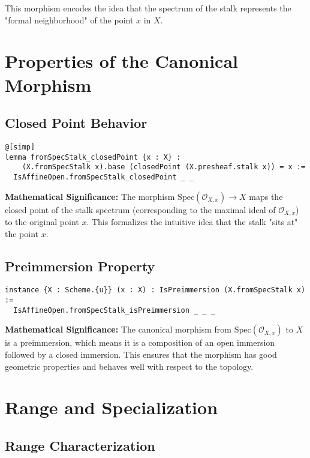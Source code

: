 \documentclass{article}
\theoremstyle{definition}
\begin{document}
This morphism encodes the idea that the spectrum of the stalk represents the "formal neighborhood" of the point $x$ in $X$.

\section{Properties of the Canonical Morphism}

\subsection{Closed Point Behavior}

\begin{lstlisting}
@[simp]
lemma fromSpecStalk_closedPoint {x : X} :
    (X.fromSpecStalk x).base (closedPoint (X.presheaf.stalk x)) = x :=
  IsAffineOpen.fromSpecStalk_closedPoint _ _
\end{lstlisting}

\textbf{Mathematical Significance:} The morphism $\mathrm{Spec}(\mathcal{O}_{X,x}) \to X$ maps the closed point of the stalk spectrum (corresponding to the maximal ideal of $\mathcal{O}_{X,x}$) to the original point $x$. This formalizes the intuitive idea that the stalk "sits at" the point $x$.

\subsection{Preimmersion Property}

\begin{lstlisting}
instance {X : Scheme.{u}} (x : X) : IsPreimmersion (X.fromSpecStalk x) :=
  IsAffineOpen.fromSpecStalk_isPreimmersion _ _ _
\end{lstlisting}

\textbf{Mathematical Significance:} The canonical morphism from $\mathrm{Spec}(\mathcal{O}_{X,x})$ to $X$ is a preimmersion, which means it is a composition of an open immersion followed by a closed immersion. This ensures that the morphism has good geometric properties and behaves well with respect to the topology.

\section{Range and Specialization}

\subsection{Range Characterization}
\end{document}
